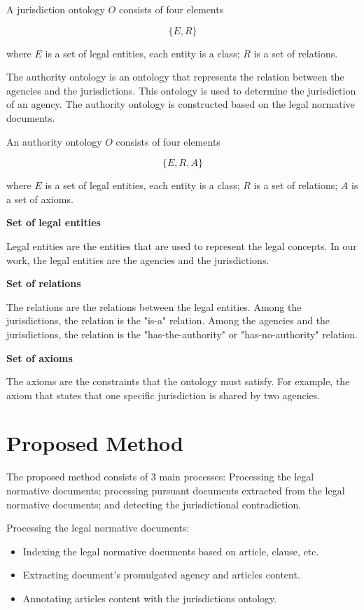     \begin{definition}
        A jurisdiction ontology $O$ consists of four elements 
        
        $$\{E, R\}$$
        
        where $E$ is a set of legal entities, each entity is a class; $R$ is a set of relations.
    \end{definition}

    The authority ontology is an ontology that represents the relation between the agencies and the jurisdictions. This ontology is used to determine the jurisdiction of an agency. The authority ontology is constructed based on the legal normative documents.


    \begin{definition}
        An authority ontology $O$ consists of four elements 
        
        $$\{E, R, A\}$$
        
        where $E$ is a set of legal entities, each entity is a class; $R$ is a set of relations; $A$ is a set of axioms.
    \end{definition}

    \textbf{Set of legal entities}

    Legal entities are the entities that are used to represent the legal concepts. In our work, the legal entities are the agencies and the jurisdictions.

    \textbf{Set of relations}

    The relations are the relations between the legal entities. Among the jurisdictions, the relation is the "is-a" relation. Among the agencies and the jurisdictions, the relation is the "has-the-authority" or "has-no-authority" relation.

    \textbf{Set of axioms}

    The axioms are the constraints that the ontology must satisfy. For example, the axiom that states that one specific jurisdiction is shared by two agencies.

\section{Proposed Method}

The proposed method consists of 3 main processes: Processing the legal normative documents; processing pursuant documents extracted from the legal normative documents; and detecting the jurisdictional contradiction.

Processing the legal normative documents:
    \begin{itemize}
        \item Indexing the legal normative documents based on article, clause, etc.
        \item Extracting document's promulgated agency and articles content.
        \item Annotating articles content with the jurisdictions ontology.
    \end{itemize}

